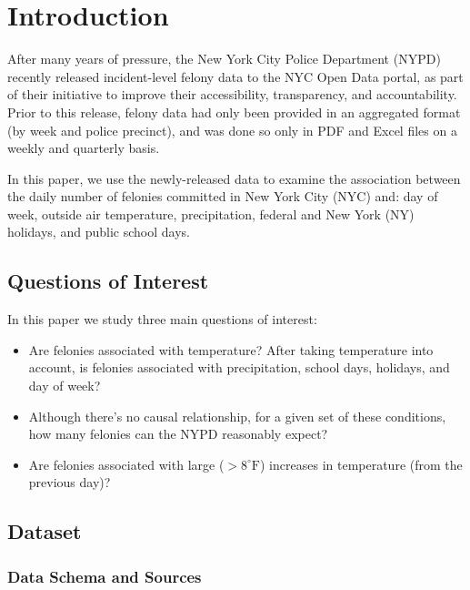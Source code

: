 \documentclass[11pt,notitlepage]{article}
\newcommand{\degf}{^\circ\text{F}}
\begin{document}
\pagebreak

\singlespacing



\section{Introduction}



After many years of pressure, the New York City Police Department (NYPD) recently released incident-level felony data to the NYC Open Data portal, as part of their initiative to improve their accessibility, transparency, and accountability. Prior to this release, felony data had only been provided in an aggregated format (by week and police precinct), and was done so only in PDF and Excel files on a weekly and quarterly basis.

In this paper, we use the newly-released data to examine the association between the daily number of felonies committed in New York City (NYC) and: day of week, outside air temperature, precipitation, federal and New York (NY) holidays, and public school days.

\subsection{Questions of Interest}

In this paper we study three main questions of interest:

\begin{itemize}
\setlength\itemsep{-1pt}
\item Are felonies associated with temperature? After taking temperature into account, is felonies associated with precipitation, school days, holidays, and day of week?
\item Although there’s no causal relationship, for a given set of these conditions, how many felonies can the NYPD reasonably expect?
\item Are felonies associated with large ($>8 \degf$) increases in temperature (from the previous day)?
\end{itemize}



\subsection{Dataset}

\subsubsection{Data Schema and Sources}
\end{document}
